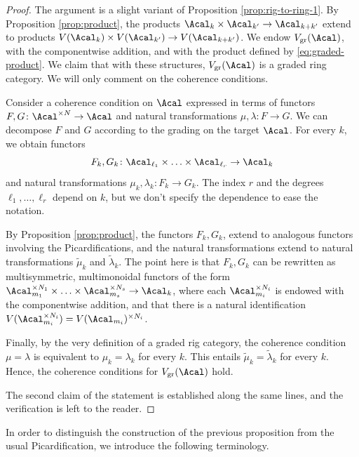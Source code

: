 \begin{proof}
The argument is a slight variant of Proposition \ref{prop:rig-to-ring-1}. By Proposition \ref{prop:product}, the products $\Acal_{k}\times\Acal_{k'}\to\Acal_{k+k'}$ extend to products $V(\Acal_{k})\times V(\Acal_{k'})\to V(\Acal_{k+k'})$. We endow $V_{\mathrm{gr}}(\Acal)$, with the componentwise addition, and with the product defined by \eqref{eq:graded-product}. We claim that with these structures, $V_{\mathrm{gr}}(\Acal)$ is a graded ring category. We will only comment on the coherence conditions.

Consider a coherence condition on $\Acal$ expressed in terms of functors $F,G\colon\Acal^{\times N}\to\Acal$ and natural transformations $\mu,\lambda\colon F\to G$. We can decompose $F$ and $G$ according to the grading on the target $\Acal$. For every $k$, we obtain functors\vspace*{-3pt}\enlargethispage{.5\baselineskip}
\[
F_{k},G_{k}\colon \Acal_{\ell_{1}}\times\ldots\times\Acal_{\ell_{r}}\to\Acal_{k}
\]
and natural transformations $\mu_{k},\lambda_{k}\colon F_{k}\to G_{k}$. The index $r$ and the degrees $\ell_{1},\ldots,\ell_{r}$ depend on $k$, but we don't specify the dependence to ease the notation.

By Proposition \ref{prop:product}, the functors $F_{k}, G_{k}$, extend to analogous functors involving the Picardifications, and the natural transformations extend to natural transformations $\widetilde{\mu}_{k}$ and $\widetilde{\lambda}_{k}$. The point here is that $F_{k}, G_{k}$ can be rewritten as multisymmetric, multimonoidal functors of the form $\Acal_{m_{1}}^{\times N_{1}}\times\ldots\times\Acal_{m_{s}}^{\times N_{s}}\to\Acal_{k}$, where each $\Acal_{m_{i}}^{\times N_{i}}$ is endowed with the componentwise addition, and that there is a natural identification $V(\Acal_{m_{i}}^{\times N_{i}})=V(\Acal_{m_{i}})^{\times N_{i}}$.

Finally, by the very definition of a graded rig category, the coherence condition $\mu=\lambda$ is equivalent to $\mu_{k}=\lambda_{k}$ for every $k$. This entails $\widetilde{\mu}_{k}=\widetilde{\lambda}_{k}$ for every $k$. Hence, the coherence conditions for $V_{\mathrm{gr}}(\Acal)$ hold.

The second claim of the statement is established along the same lines, and the verification is left to the reader.
\end{proof}

In order to distinguish the construction of the previous proposition from the usual Picardification, we introduce the following terminology.

